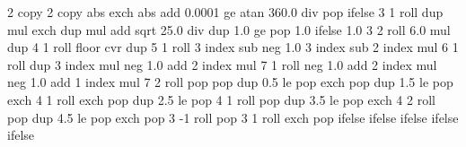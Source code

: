 %
%
%



%
%

{\pgfpoint{-50bp}{-50bp}}
{\pgfpoint{50bp}{50bp}}
{}
{ %
  2 copy %
  2 copy abs exch abs add 0.0001 ge
  {atan 360.0 div} %
  { pop } %
  ifelse  %
  3 1 roll %
  dup mul %
  exch dup mul %
  add sqrt %
  25.0 div %
  dup 1.0 ge %
  { pop 1.0 }{} ifelse %
  1.0 %
  3 2 roll 6.0 mul dup 4 1 roll %
  floor cvr  %
  dup 5 1 roll %
  3 index sub neg %
  1.0 3 index sub %
  2 index mul %
  6 1 roll %
  dup 3 index mul neg 1.0 add %
  2 index mul %
  7 1 roll %
  neg 1.0 add %
  2 index mul neg 1.0  add %
  1 index mul %
  7 2 roll %
  pop pop %
  dup 0.5 le %
  { %
    pop exch pop
  }
  { dup 1.5 le %
    { %
      pop exch 4 1 roll exch pop
    }
    { dup 2.5 le %
      { %
        pop 4 1 roll pop
      }
      { dup 3.5 le %
        { %
          pop exch 4 2 roll pop
        }
        { dup 4.5 le %
          { %
            pop exch pop 3 -1 roll
          }
          { %
            pop 3 1 roll exch pop
          }
          ifelse
        }
        ifelse %
      }
      ifelse %
    }
    ifelse %
  }
  ifelse %
}%


